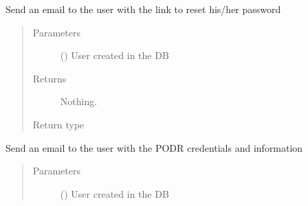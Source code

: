 \documentclass[letterpaper,10pt,english]{sphinxmanual}
\begin{document}

\begin{fulllineitems}
\label{\detokenize{CE_app.auth:CE_app.auth.email.send_password_reset_email}}
\sphinxAtStartPar
Send an email to the user with the link to reset his/her password
\begin{quote}\begin{description}
\item[{Parameters}] \leavevmode
\sphinxAtStartPar
{} ({\hyperref[\detokenize{CE_app:CE_app.models.User}]{}}) \textendash{} User created in the DB

\item[{Returns}] \leavevmode
\sphinxAtStartPar
Nothing.

\item[{Return type}] \leavevmode
\sphinxAtStartPar


\end{description}\end{quote}

\end{fulllineitems}


\begin{fulllineitems}
\label{\detokenize{CE_app.auth:CE_app.auth.email.send_podr_credentials}}
\sphinxAtStartPar
Send an email to the user with the PODR credentials and information
\begin{quote}\begin{description}
\item[{Parameters}] \leavevmode
\sphinxAtStartPar
{} ({\hyperref[\detokenize{CE_app:CE_app.models.User}]{}}) \textendash{} User created in the DB

\end{description}\end{quote}

\end{fulllineitems}
\end{document}
